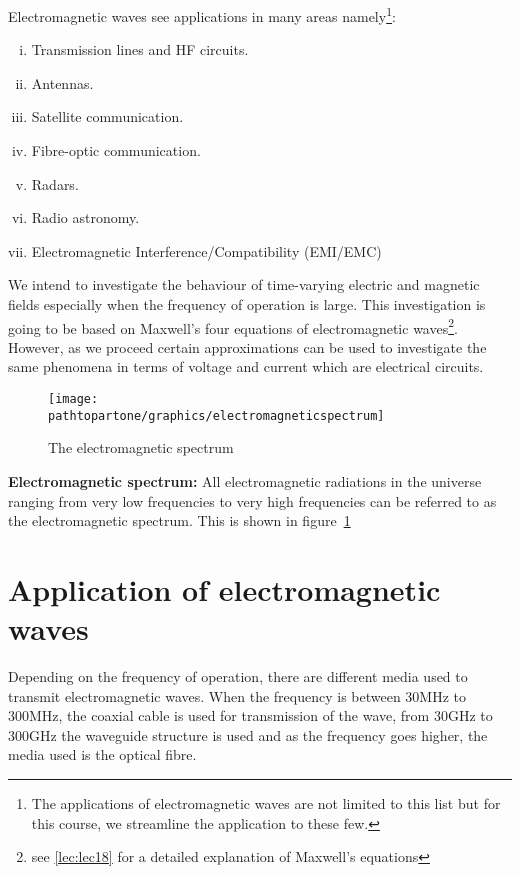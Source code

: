 Electromagnetic waves see applications in many areas namely\footnote{
The applications of electromagnetic waves are not limited to this list but for this course, we streamline the application to these few.
}:
\begin{enumerate}[(i)]
\item Transmission lines and HF circuits.
\item Antennas.
\item Satellite communication.
\item Fibre-optic communication.
\item Radars.
\item Radio astronomy.
\item Electromagnetic Interference/Compatibility (EMI/EMC)
\end{enumerate}

We intend to investigate the behaviour of time-varying electric and magnetic fields especially when the frequency of operation is large. This investigation is going to be based on Maxwell's four equations of electromagnetic waves\footnote{
see \autoref{lec:lec18} for a detailed explanation of Maxwell's equations
}. However, as we proceed certain approximations can be used to investigate the same phenomena in terms of voltage and current which are electrical circuits.

\begin{figure}[h]
\centering
\texttt{[image: \\pathtopartone/graphics/electromagneticspectrum]}
\caption{The electromagnetic spectrum}
\label{fig:electromagneticspectrum}
\end{figure}

\textbf{Electromagnetic spectrum:} All electromagnetic radiations in the universe ranging from very low frequencies to very high frequencies can be referred to as the electromagnetic spectrum. This is shown in figure~\ref{fig:electromagneticspectrum}

\section{Application of electromagnetic waves}
Depending on the frequency of operation, there are different media used to transmit electromagnetic waves. When the frequency is between 30MHz to 300MHz, the coaxial cable is used for transmission of the wave, from 30GHz to 300GHz the waveguide structure is used and as the frequency goes higher, the media used is the optical fibre.

